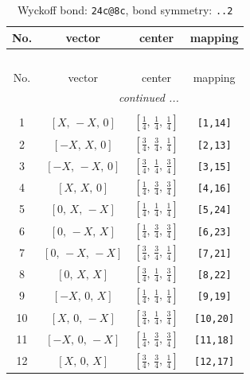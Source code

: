 \documentclass[fleqn,8pt]{jsarticle}
\begin{document}
\renewcommand{\arraystretch}{1.2}
\begin{longtable}{cccc}
\caption{Wyckoff bond: {\tt 24c@8c}, bond symmetry: {\tt ..2}}
 \\
 \hline \hline
No. & vector & center & mapping \\ \hline \endfirsthead

\multicolumn{3}{l}{\tablename\ \thetable{}} \\
 \hline \hline
No. & vector & center & mapping \\ \hline \endhead

 \hline \hline
\multicolumn{3}{r}{\footnotesize\it continued ...} \\ \endfoot

 \hline \hline
\multicolumn{3}{r}{} \\ \endlastfoot

1 & $\left[ X,\, - X,\, 0 \right]$ & $\left[ \frac{1}{4},\, \frac{1}{4},\, \frac{1}{4} \right]$ & {\tt [1,14]} \\ \hline
2 & $\left[ - X,\, X,\, 0 \right]$ & $\left[ \frac{3}{4},\, \frac{3}{4},\, \frac{1}{4} \right]$ & {\tt [2,13]} \\ \hline
3 & $\left[ - X,\, - X,\, 0 \right]$ & $\left[ \frac{3}{4},\, \frac{1}{4},\, \frac{3}{4} \right]$ & {\tt [3,15]} \\ \hline
4 & $\left[ X,\, X,\, 0 \right]$ & $\left[ \frac{1}{4},\, \frac{3}{4},\, \frac{3}{4} \right]$ & {\tt [4,16]} \\ \hline
5 & $\left[ 0,\, X,\, - X \right]$ & $\left[ \frac{1}{4},\, \frac{1}{4},\, \frac{1}{4} \right]$ & {\tt [5,24]} \\ \hline
6 & $\left[ 0,\, - X,\, X \right]$ & $\left[ \frac{1}{4},\, \frac{3}{4},\, \frac{3}{4} \right]$ & {\tt [6,23]} \\ \hline
7 & $\left[ 0,\, - X,\, - X \right]$ & $\left[ \frac{3}{4},\, \frac{3}{4},\, \frac{1}{4} \right]$ & {\tt [7,21]} \\ \hline
8 & $\left[ 0,\, X,\, X \right]$ & $\left[ \frac{3}{4},\, \frac{1}{4},\, \frac{3}{4} \right]$ & {\tt [8,22]} \\ \hline
9 & $\left[ - X,\, 0,\, X \right]$ & $\left[ \frac{1}{4},\, \frac{1}{4},\, \frac{1}{4} \right]$ & {\tt [9,19]} \\ \hline
10 & $\left[ X,\, 0,\, - X \right]$ & $\left[ \frac{3}{4},\, \frac{1}{4},\, \frac{3}{4} \right]$ & {\tt [10,20]} \\ \hline
11 & $\left[ - X,\, 0,\, - X \right]$ & $\left[ \frac{1}{4},\, \frac{3}{4},\, \frac{3}{4} \right]$ & {\tt [11,18]} \\ \hline
12 & $\left[ X,\, 0,\, X \right]$ & $\left[ \frac{3}{4},\, \frac{3}{4},\, \frac{1}{4} \right]$ & {\tt [12,17]} \\
\end{longtable}
\end{document}
